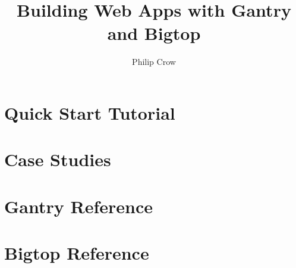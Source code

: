 \documentclass{book}
\begin{document}
\title{Building Web Apps with Gantry and Bigtop}
\author{Philip Crow}
\maketitle

\tableofcontents
\listoffigures

\part{Quick Start Tutorial}
\part{Case Studies}
\part{Gantry Reference}
\part{Bigtop Reference}
\end{document}
